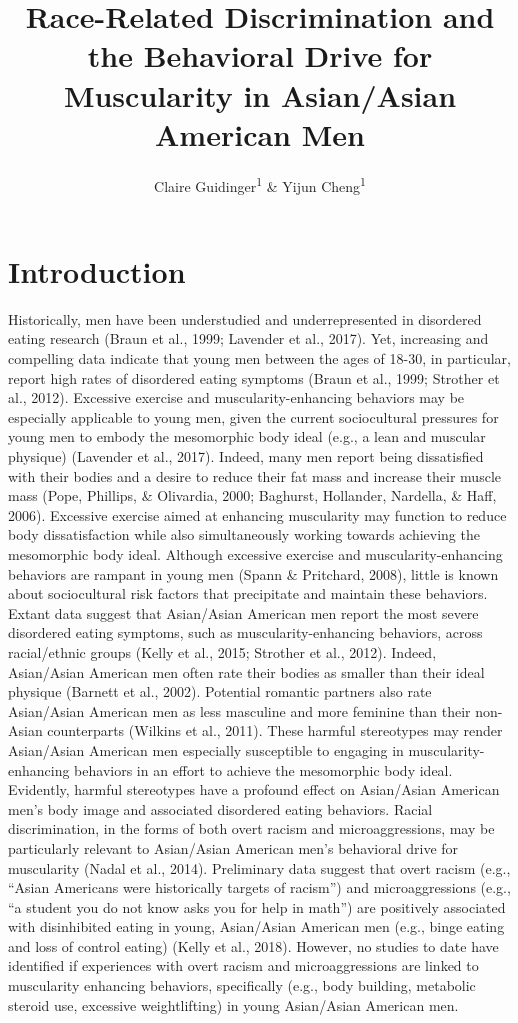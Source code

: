 \documentclass[
  english,
  man, fleqn, noextraspace,floatsintext]{apa6}
\title{Race-Related Discrimination and the Behavioral Drive for Muscularity in Asian/Asian American Men}
\author{Claire Guidinger\textsuperscript{1} \& Yijun Cheng\textsuperscript{1}}
\date{}
\affiliation{\vspace{0.5cm}\textsuperscript{1} University of Oregon}
\begin{document}
\maketitle

\hypertarget{introduction}{%
\section{Introduction}\label{introduction}}

Historically, men have been understudied and underrepresented in disordered eating research (Braun et al., 1999; Lavender et al., 2017). Yet, increasing and compelling data indicate that young men between the ages of 18-30, in particular, report high rates of disordered eating symptoms (Braun et al., 1999; Strother et al., 2012). Excessive exercise and muscularity-enhancing behaviors may be especially applicable to young men, given the current sociocultural pressures for young men to embody the mesomorphic body ideal (e.g., a lean and muscular physique) (Lavender et al., 2017). Indeed, many men report being dissatisfied with their bodies and a desire to reduce their fat mass and increase their muscle mass (Pope, Phillips, \& Olivardia, 2000; Baghurst, Hollander, Nardella, \& Haff, 2006). Excessive exercise aimed at enhancing muscularity may function to reduce body dissatisfaction while also simultaneously working towards achieving the mesomorphic body ideal. Although excessive exercise and muscularity-enhancing behaviors are rampant in young men (Spann \& Pritchard, 2008), little is known about sociocultural risk factors that precipitate and maintain these behaviors.
Extant data suggest that Asian/Asian American men report the most severe disordered eating symptoms, such as muscularity-enhancing behaviors, across racial/ethnic groups (Kelly et al., 2015; Strother et al., 2012). Indeed, Asian/Asian American men often rate their bodies as smaller than their ideal physique (Barnett et al., 2002). Potential romantic partners also rate Asian/Asian American men as less masculine and more feminine than their non-Asian counterparts (Wilkins et al., 2011). These harmful stereotypes may render Asian/Asian American men especially susceptible to engaging in muscularity-enhancing behaviors in an effort to achieve the mesomorphic body ideal.
Evidently, harmful stereotypes have a profound effect on Asian/Asian American men's body image and associated disordered eating behaviors. Racial discrimination, in the forms of both overt racism and microaggressions, may be particularly relevant to Asian/Asian American men's behavioral drive for muscularity (Nadal et al., 2014). Preliminary data suggest that overt racism (e.g., ``Asian Americans were historically targets of racism'') and microaggressions (e.g., ``a student you do not know asks you for help in math'') are positively associated with disinhibited eating in young, Asian/Asian American men (e.g., binge eating and loss of control eating) (Kelly et al., 2018). However, no studies to date have identified if experiences with overt racism and microaggressions are linked to muscularity enhancing behaviors, specifically (e.g., body building, metabolic steroid use, excessive weightlifting) in young Asian/Asian American men.
\end{document}
